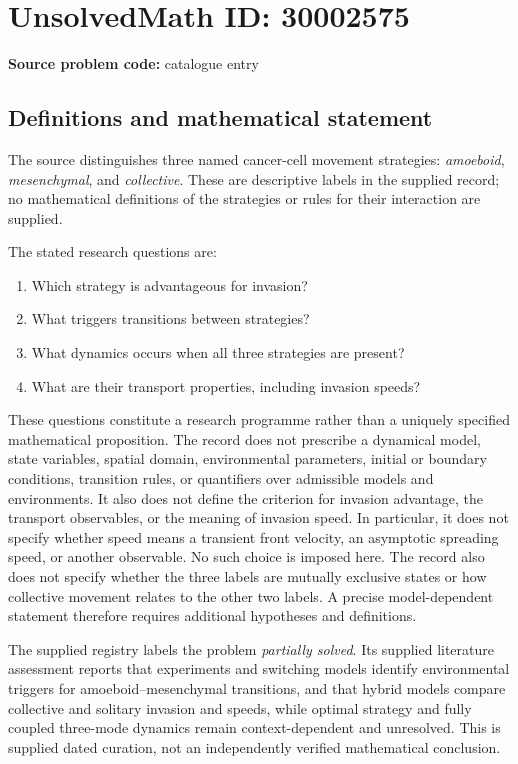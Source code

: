 \documentclass[11pt]{article}
\begin{document}
\section*{UnsolvedMath ID: 30002575}
\textbf{Source problem code:} catalogue entry
\subsection{Definitions and mathematical statement}
The source distinguishes three named cancer-cell movement strategies: \emph{amoeboid}, \emph{mesenchymal}, and \emph{collective}. These are descriptive labels in the supplied record; no mathematical definitions of the strategies or rules for their interaction are supplied.

The stated research questions are:
\begin{enumerate}
\item Which strategy is advantageous for invasion?
\item What triggers transitions between strategies?
\item What dynamics occurs when all three strategies are present?
\item What are their transport properties, including invasion speeds?
\end{enumerate}

These questions constitute a research programme rather than a uniquely specified mathematical proposition. The record does not prescribe a dynamical model, state variables, spatial domain, environmental parameters, initial or boundary conditions, transition rules, or quantifiers over admissible models and environments. It also does not define the criterion for invasion advantage, the transport observables, or the meaning of invasion speed. In particular, it does not specify whether speed means a transient front velocity, an asymptotic spreading speed, or another observable. No such choice is imposed here. The record also does not specify whether the three labels are mutually exclusive states or how collective movement relates to the other two labels. A precise model-dependent statement therefore requires additional hypotheses and definitions.

The supplied registry labels the problem \emph{partially solved}. Its supplied literature assessment reports that experiments and switching models identify environmental triggers for amoeboid--mesenchymal transitions, and that hybrid models compare collective and solitary invasion and speeds, while optimal strategy and fully coupled three-mode dynamics remain context-dependent and unresolved. This is supplied dated curation, not an independently verified mathematical conclusion.
\end{document}
